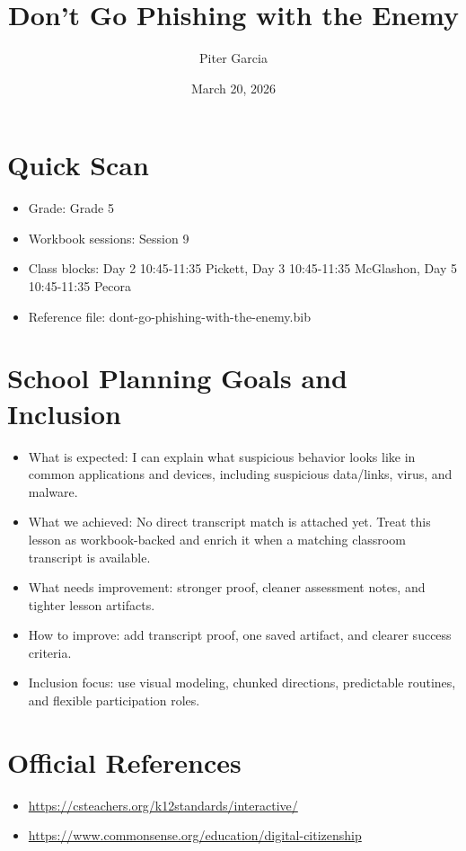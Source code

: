 \documentclass[11pt]{article}
\title{Don’t Go Phishing with the Enemy}
\author{Piter Garcia}
\date{March 20, 2026}
\begin{document}
    \maketitle
    \section*{Quick Scan}
    \begin{itemize}[leftmargin=*]
    \item Grade: Grade 5
    \item Workbook sessions: Session 9
    \item Class blocks: Day 2 10:45-11:35 Pickett, Day 3 10:45-11:35 McGlashon, Day 5 10:45-11:35 Pecora
    \item Reference file: dont-go-phishing-with-the-enemy.bib
    \end{itemize}
    \section*{School Planning Goals and Inclusion}
    \begin{itemize}[leftmargin=*]
    \item What is expected: I can explain what suspicious behavior looks like in common applications and devices, including suspicious data/links, virus, and malware.
    \item What we achieved: No direct transcript match is attached yet. Treat this lesson as workbook-backed and enrich it when a matching classroom transcript is available.
    \item What needs improvement: stronger proof, cleaner assessment notes, and tighter lesson artifacts.
    \item How to improve: add transcript proof, one saved artifact, and clearer success criteria.
    \item Inclusion focus: use visual modeling, chunked directions, predictable routines, and flexible participation roles.
    \end{itemize}
    \section*{Official References}
    \begin{itemize}[leftmargin=*]
    \item \url{https://csteachers.org/k12standards/interactive/}
\item \url{https://www.commonsense.org/education/digital-citizenship}

    \end{itemize}
    
\end{document}
